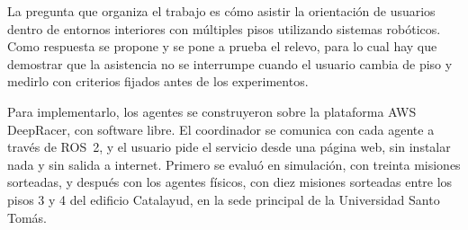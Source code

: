 La pregunta que organiza el trabajo es cómo asistir la orientación de usuarios dentro
de entornos interiores con múltiples pisos utilizando sistemas robóticos. Como respuesta se propone y se pone a prueba el relevo, para lo cual hay que demostrar que la
asistencia no se interrumpe cuando el usuario cambia de piso y medirlo con criterios
fijados antes de los experimentos.

Para implementarlo, los agentes se construyeron sobre la plataforma AWS DeepRacer, con software libre. El
coordinador se comunica con cada agente a través de ROS~2, y el usuario pide el
servicio desde una página web, sin instalar nada y
sin salida a internet. Primero se evaluó en simulación, con treinta misiones sorteadas, y después con los agentes físicos, con diez misiones sorteadas
entre los pisos 3 y 4 del edificio Catalayud, en la sede principal de la Universidad Santo Tomás.
